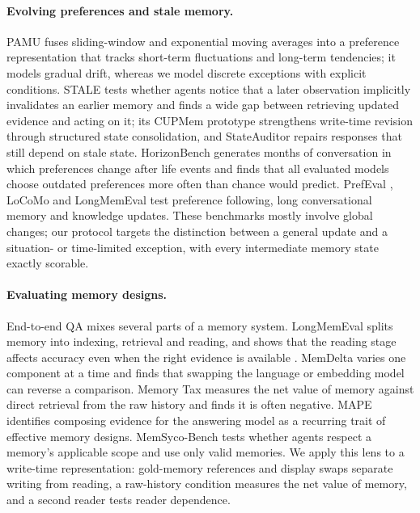 \documentclass[11pt]{article}
\begin{document}
\paragraph{Evolving preferences and stale memory.} PAMU \citep{sun-etal-2026-preference} fuses sliding-window and exponential moving averages into a preference representation that tracks short-term fluctuations and long-term tendencies; it models gradual drift, whereas we model discrete exceptions with explicit conditions. STALE \citep{chao2026stale} tests whether agents notice that a later observation implicitly invalidates an earlier memory and finds a wide gap between retrieving updated evidence and acting on it; its CUPMem prototype strengthens write-time revision through structured state consolidation, and StateAuditor \citep{sun2026stateauditor} repairs responses that still depend on stale state. HorizonBench \citep{li2026horizonbench} generates months of conversation in which preferences change after life events and finds that all evaluated models choose outdated preferences more often than chance would predict. PrefEval \citep{zhao2025prefeval}, LoCoMo \citep{maharana2024locomo} and LongMemEval \citep{wu2025longmemeval} test preference following, long conversational memory and knowledge updates. These benchmarks mostly involve global changes; our protocol targets the distinction between a general update and a situation- or time-limited exception, with every intermediate memory state exactly scorable.

\paragraph{Evaluating memory designs.} End-to-end QA mixes several parts of a memory system. LongMemEval splits memory into indexing, retrieval and reading, and shows that the reading stage affects accuracy even when the right evidence is available \citep{wu2025longmemeval}. MemDelta \citep{wang2026memdelta} varies one component at a time and finds that swapping the language or embedding model can reverse a comparison. Memory Tax \citep{he2026memorytax} measures the net value of memory against direct retrieval from the raw history and finds it is often negative. MAPE \citep{ding2026mape} identifies composing evidence for the answering model as a recurring trait of effective memory designs. MemSyco-Bench \citep{xiang2026memsyco} tests whether agents respect a memory's applicable scope and use only valid memories. We apply this lens to a write-time representation: gold-memory references and display swaps separate writing from reading, a raw-history condition measures the net value of memory, and a second reader tests reader dependence.
\end{document}
